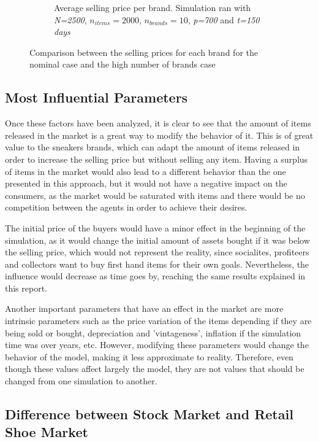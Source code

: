 \documentclass[12pt]{article}
\begin{document}
\begin{figure}
\begin{subfigure}{0.5\textwidth}
    \caption{Average selling price per brand. Simulation ran with \textit{N=2500}, \textit{$n_{items}=2000$}, \textit{$n_{brands}=10$}, \textit{p=700} and \textit{t=150 days}}
    \label{avgbrands}
\end{subfigure}
\caption{Comparison between the selling prices for each brand for the nominal case and the high number of brands case}
\label{comppbrands}
\end{figure}

\subsection{Most Influential Parameters}

Once these factors have been analyzed, it is clear to see that the amount of items released in the market is a great way to modify the behavior of it. This is of great value to the sneakers brands, which can adapt the amount of items released in order to increase the selling price but without selling any item. Having a surplus of items in the market would also lead to a different behavior than the one presented in this approach, but it would not have a negative impact on the consumers, as the market would be saturated with items and there would be no competition between the agents in order to achieve their desires. 

The initial price of the buyers would have a minor effect in the beginning of the simulation, as it would change the initial amount of assets bought if it was below the selling price, which would not represent the reality, since socialites, profiteers and collectors want to buy first hand items for their own goals. Nevertheless, the influence would decrease as time goes by, reaching the same results explained in this report. 

Another important parameters that have an effect in the market are more intrinsic parameters such as the price variation of the items depending if they are being sold or bought, depreciation and 'vintageness', inflation if the simulation time was over years, etc. However, modifying these parameters would change the behavior of the model, making it less approximate to reality. Therefore, even though these values affect largely the model, they are not values that should be changed from one simulation to another.

\subsection{Difference between Stock Market and Retail Shoe Market}
\end{document}
